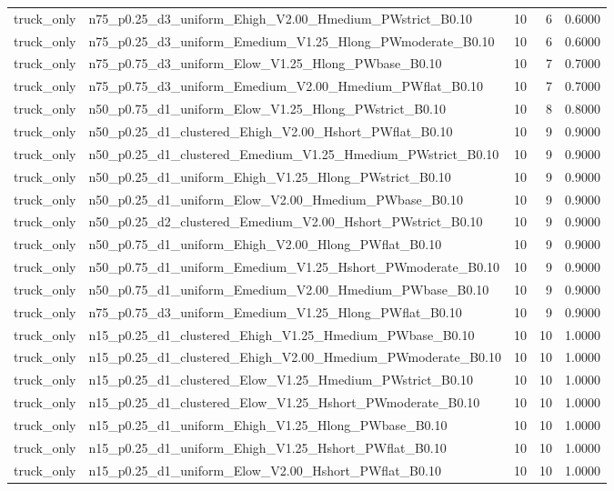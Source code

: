 \begin{tabular}{llrrr}
truck_only & n75_p0.25_d3_uniform_Ehigh_V2.00_Hmedium_PWstrict_B0.10 & 10 & 6 & 0.6000 \\
truck_only & n75_p0.25_d3_uniform_Emedium_V1.25_Hlong_PWmoderate_B0.10 & 10 & 6 & 0.6000 \\
truck_only & n75_p0.75_d3_uniform_Elow_V1.25_Hlong_PWbase_B0.10 & 10 & 7 & 0.7000 \\
truck_only & n75_p0.75_d3_uniform_Emedium_V2.00_Hmedium_PWflat_B0.10 & 10 & 7 & 0.7000 \\
truck_only & n50_p0.75_d1_uniform_Elow_V1.25_Hlong_PWstrict_B0.10 & 10 & 8 & 0.8000 \\
truck_only & n50_p0.25_d1_clustered_Ehigh_V2.00_Hshort_PWflat_B0.10 & 10 & 9 & 0.9000 \\
truck_only & n50_p0.25_d1_clustered_Emedium_V1.25_Hmedium_PWstrict_B0.10 & 10 & 9 & 0.9000 \\
truck_only & n50_p0.25_d1_uniform_Ehigh_V1.25_Hlong_PWstrict_B0.10 & 10 & 9 & 0.9000 \\
truck_only & n50_p0.25_d1_uniform_Elow_V2.00_Hmedium_PWbase_B0.10 & 10 & 9 & 0.9000 \\
truck_only & n50_p0.25_d2_clustered_Emedium_V2.00_Hshort_PWstrict_B0.10 & 10 & 9 & 0.9000 \\
truck_only & n50_p0.75_d1_uniform_Ehigh_V2.00_Hlong_PWflat_B0.10 & 10 & 9 & 0.9000 \\
truck_only & n50_p0.75_d1_uniform_Emedium_V1.25_Hshort_PWmoderate_B0.10 & 10 & 9 & 0.9000 \\
truck_only & n50_p0.75_d1_uniform_Emedium_V2.00_Hmedium_PWbase_B0.10 & 10 & 9 & 0.9000 \\
truck_only & n75_p0.75_d3_uniform_Emedium_V1.25_Hlong_PWflat_B0.10 & 10 & 9 & 0.9000 \\
truck_only & n15_p0.25_d1_clustered_Ehigh_V1.25_Hmedium_PWbase_B0.10 & 10 & 10 & 1.0000 \\
truck_only & n15_p0.25_d1_clustered_Ehigh_V2.00_Hmedium_PWmoderate_B0.10 & 10 & 10 & 1.0000 \\
truck_only & n15_p0.25_d1_clustered_Elow_V1.25_Hmedium_PWstrict_B0.10 & 10 & 10 & 1.0000 \\
truck_only & n15_p0.25_d1_clustered_Elow_V1.25_Hshort_PWmoderate_B0.10 & 10 & 10 & 1.0000 \\
truck_only & n15_p0.25_d1_uniform_Ehigh_V1.25_Hlong_PWbase_B0.10 & 10 & 10 & 1.0000 \\
truck_only & n15_p0.25_d1_uniform_Ehigh_V1.25_Hshort_PWflat_B0.10 & 10 & 10 & 1.0000 \\
truck_only & n15_p0.25_d1_uniform_Elow_V2.00_Hshort_PWflat_B0.10 & 10 & 10 & 1.0000 \\

\end{tabular}
